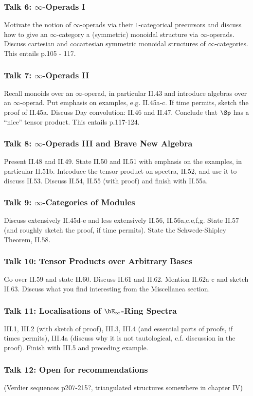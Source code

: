 \documentclass{article}
\begin{document}
\subsubsection*{Talk 6: $\infty$-Operads I}
Motivate the notion of $\infty$-operads via their $1$-categorical 
precursors and discuss how to give an $\infty$-category a 
(symmetric) monoidal structure via $\infty$-operads. Discuss 
cartesian and cocartesian symmetric monoidal structures of
$\infty$-categories. This entails p.105 - 117.

\subsubsection*{Talk 7: $\infty$-Operads II}
Recall monoids over an $\infty$-operad, in particular II.43 and 
introduce algebras over an $\infty$-operad.
Put emphasis on examples, e.g. II.45a-c.
If time permits, sketch the proof of II.45a.
Discuss Day convolution: II.46 and II.47.
Conclude that $\Sp$ has a \enquote{nice} tensor product.
This entails p.117-124.

\subsubsection*{Talk 8: $\infty$-Operads III and Brave New Algebra}
Present II.48 and II.49. State II.50 and II.51 with emphasis on 
the examples, in particular II.51b. Introduce the tensor product on
spectra, II.52, and use it to discuss II.53. Discuss II.54, II.55 (with proof)
and finish with II.55a.

\subsubsection*{Talk 9: $\infty$-Categories of Modules}
Discuss extensively II.45d-e and less extensively II.56, II.56a,c,e,f,g.
State II.57 (and roughly sketch the proof, if time permits).
State the Schwede-Shipley Theorem, II.58.

\subsubsection*{Talk 10: Tensor Products over Arbitrary Bases}
Go over II.59 and state II.60. Discuss II.61 and II.62.
Mention II.62a-c and sketch II.63. Discuss what you find interesting
from the Miscellanea section.

\subsubsection*{Talk 11: Localisations of $\bE_\infty$-Ring Spectra}
III.1, III.2 (with sketch of proof), III.3, III.4 (and essential parts
of proofs, if times permits), III.4a (discuss why it is not tautological,
c.f. discussion in the proof). Finish with III.5 and preceding example.

\subsubsection*{Talk 12: Open for recommendations }
(Verdier sequences p207-215?, triangulated structures somewhere in chapter IV)

\printbibliography
\end{document}
